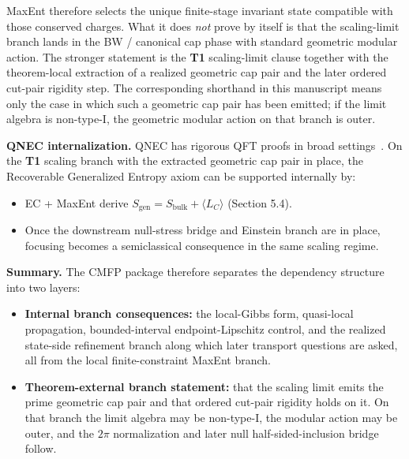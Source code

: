 MaxEnt therefore selects the unique finite-stage invariant state compatible with those conserved charges. What it does \emph{not} prove by itself is that the scaling-limit branch lands in the BW / canonical cap phase with standard geometric modular action. The stronger statement is the \textbf{T1} scaling-limit clause together with the theorem-local extraction of a realized geometric cap pair and the later ordered cut-pair rigidity step. The corresponding shorthand in this manuscript means only the case in which such a geometric cap pair has been emitted; if the limit algebra is non-type-I, the geometric modular action on that branch is outer.

\textbf{QNEC internalization.} QNEC has rigorous QFT proofs in broad settings~\cite{bousso16}. On the \textbf{T1} scaling branch with the extracted geometric cap pair in place, the Recoverable Generalized Entropy axiom can be supported internally by:
\begin{itemize}
\item
EC + MaxEnt derive \(S_{\mathrm{gen}}=S_{\mathrm{bulk}}+\langle L_C\rangle\) (Section 5.4).
\item
Once the downstream null-stress bridge and Einstein branch are in place, focusing becomes a semiclassical consequence in the same scaling regime.
\end{itemize}

\textbf{Summary.} The CMFP package therefore separates the dependency structure into two layers:
\begin{itemize}
\item
\textbf{Internal branch consequences:} the local-Gibbs form, quasi-local propagation, bounded-interval endpoint-Lipschitz control, and the realized state-side refinement branch along which later transport questions are asked, all from the local finite-constraint MaxEnt branch.
\item
\textbf{Theorem-external branch statement:} that the scaling limit emits the prime geometric cap pair and that ordered cut-pair rigidity holds on it. On that branch the limit algebra may be non-type-I, the modular action may be outer, and the \(2\pi\) normalization and later null half-sided-inclusion bridge follow.
\end{itemize}

